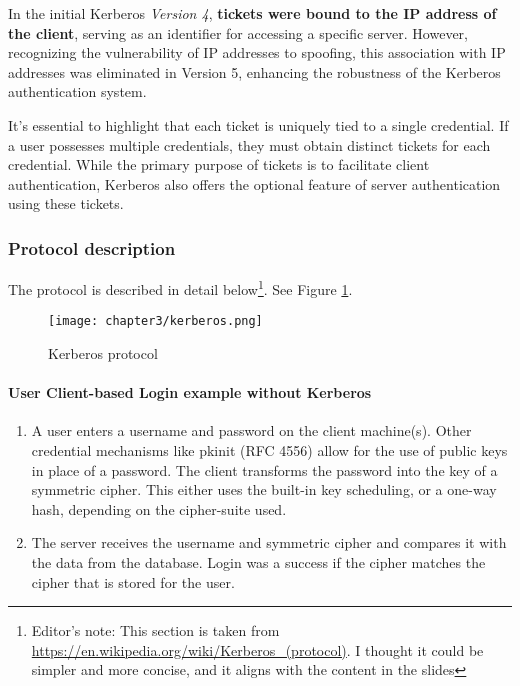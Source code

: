 In the initial Kerberos \textit{Version 4}, \textbf{tickets were bound to the IP address of the client}, serving as an identifier for accessing a specific server. However, recognizing the vulnerability of IP addresses to spoofing, this association with IP addresses was eliminated in Version 5, enhancing the robustness of the Kerberos authentication system.

It's essential to highlight that each ticket is uniquely tied to a single credential. If a user possesses multiple credentials, they must obtain distinct tickets for each credential. While the primary purpose of tickets is to facilitate client authentication, Kerberos also offers the optional feature of server authentication using these tickets.



\subsubsection{Protocol description}
The protocol is described in detail below\footnote{Editor's note: This section is taken from \url{https://en.wikipedia.org/wiki/Kerberos_(protocol)}. I thought it could be simpler and more concise, and it aligns with the content in the slides}.
See Figure \ref{fig:kerberos}.

\begin{figure}[H]
  \centering
  \texttt{[image: chapter3/kerberos.png]}
  \caption{Kerberos protocol}
  \label{fig:kerberos}
\end{figure}

\paragraph{User Client-based Login example without Kerberos}

\begin{enumerate}
  \item A user enters a username and password on the client machine(s). Other credential mechanisms like pkinit (RFC 4556) allow for the use of public keys in place of a password. The client transforms the password into the key of a symmetric cipher. This either uses the built-in key scheduling, or a one-way hash, depending on the cipher-suite used.
  \item The server receives the username and symmetric cipher and compares it with the data from the database. Login was a success if the cipher matches the cipher that is stored for the user.
\end{enumerate}


